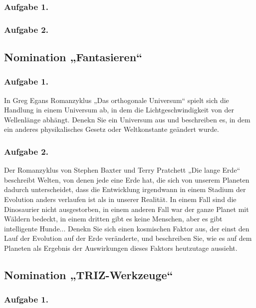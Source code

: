 \documentclass[11pt,a4paper]{article}
\begin{document}
\subsubsection*{Aufgabe 1.}\Aberration
\subsubsection*{Aufgabe 2.}\CosmicOperation

\subsection{Nomination „Fantasieren“}

\subsubsection*{Aufgabe 1.}

In Greg Egans Romanzyklus „Das orthogonale Universum“ spielt sich die Handlung
in einem Universum ab, in dem die Lichtgeschwindigkeit von der Wellenlänge
abhängt. Denekn Sie ein Universum aus und beschreiben es, in dem ein anderes
physikalisches Gesetz oder Weltkonstante geändert wurde.

\subsubsection*{Aufgabe 2.}
Der Romanzyklus von Stephen Baxter und Terry Pratchett „Die lange Erde“
beschreibt Welten, von denen jede eine Erde hat, die sich von unserem Planeten
dadurch unterscheidet, dass die Entwicklung irgendwann in einem Stadium der
Evolution anders verlaufen ist als in unserer Realität. In einem Fall sind die
Dinosaurier nicht ausgestorben, in einem anderen Fall war der ganze Planet mit
Wäldern bedeckt, in einem dritten gibt es keine Menschen, aber es gibt
intelligente Hunde... Denekn Sie sich einen kosmischen Faktor aus, der einst
den Lauf der Evolution auf der Erde veränderte, und beschreiben Sie, wie es
auf dem Planeten als Ergebnis der Auswirkungen dieses Faktors heutzutage
aussieht.

\subsection{Nomination „TRIZ-Werkzeuge“}

\subsubsection*{Aufgabe 1.}\BlackBox
\end{document}
